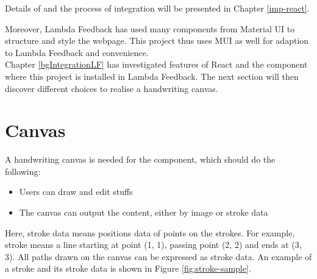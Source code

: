 \documentclass[12pt,twoside]{report}
\begin{document}
Details of  and the process of integration will be presented in Chapter \ref{imp-react}.

Moreover, Lambda Feedback has used many components from Material UI to structure and style the webpage. This project thus uses MUI as well for adaption to Lambda Feedback and convenience.
\\

Chapter \ref{bgIntegrationLF} has investigated features of React and the
component where this project is installed in Lambda Feedback. The next section
will then discover different choices to realise a handwriting canvas.


\section{Canvas}
\label{bgCanvas}
A handwriting canvas is needed for the component, which should do the following:
\begin{itemize}
    \item Users can draw and edit stuffs
    \item The canvas can output the content, either by image or stroke data
\end{itemize}
Here, stroke data means positions data of points on the strokes. For
example, stroke  means a line starting at point (1, 1), passing point (2, 2) and ends at (3, 3). All paths drawn on the canvas can be expressed as stroke data. An example of a stroke and its stroke data is shown in Figure \ref{fig:stroke-sample}.
\end{document}
